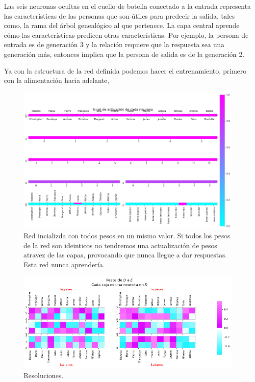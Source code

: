 Las seis neuronas ocultas en el cuello de botella conectado a la entrada representa las características de las personas que son útiles para predecir la salida, tales como, la rama del árbol genealógico al que pertenece.
La capa central aprende cómo las características predicen otras características. Por ejemplo, la persona de entrada es de generación 3 y la relación requiere que la respuesta sea una generación más, entonces implica que la persona de salida es de la generación 2.

Ya con la estructura de la red definida podemos hacer el entrenamiento, primero con la alimentación hacia adelante, 

  \begin{figure}[h]
   \centering
   \includegraphics[scale=.5]{../Figuras/Hinton/r1.png}
   \caption{Red incializda con todos pesos en un mismo valor. Si todos los pesos de la red son ideinticos no tendremos una actualización de pesos atravez de las capas, provocando que nunca llegue a dar respuestas. Esta red nunca aprendería.}
  \label{fig:r1}
  \end{figure}

    \begin{figure}[h]
   \centering
   \includegraphics[scale=.5]{../Figuras/Hinton/r2.png}
   \caption{Resoluciones.}
  \label{fig:r2}
  \end{figure}

